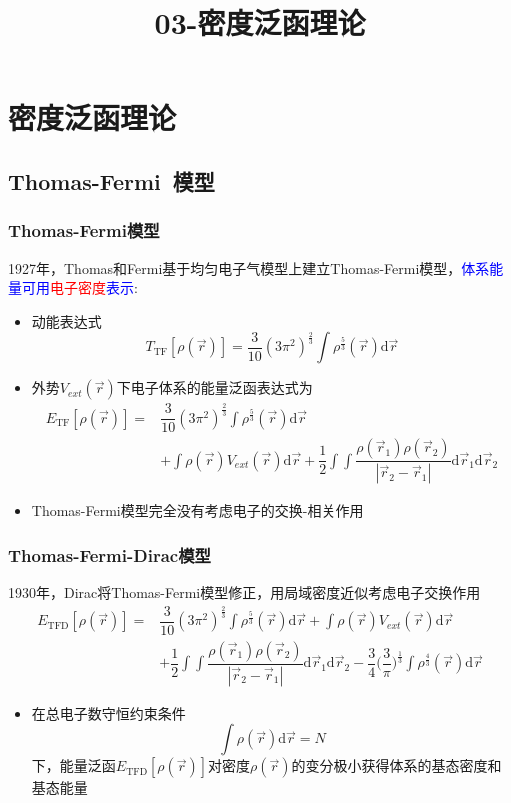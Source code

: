 \title{03-密度泛函理论}
\section{密度泛函理论}       %
\subsection{\rm{Thomas-Fermi~}模型}       %
\frame
{
	\frametitle{\textrm{Thomas-Fermi}模型} 
	\textrm{1927}年，\textrm{Thomas}和\textrm{Fermi}基于均匀电子气模型上建立\textrm{Thomas-Fermi}模型，\textcolor{blue}{体系能量可用}\textcolor{red}{电子密度}\textcolor{blue}{表示}:
	\begin{itemize}
		\item 动能表达式
			$$T_{\mathrm{TF}}[\rho(\vec r)]=\dfrac3{10}(3\pi^2)^{\frac23}\int\rho^{\frac53}(\vec r)\mathrm{d}\vec r$$
		\item 外势$V_{ext}(\vec r)$下电子体系的能量泛函表达式为
			\begin{displaymath}
				\begin{aligned}
					E_{\mathrm{TF}}[\rho(\vec r)]=&\dfrac3{10}(3\pi^2)^{\frac23}\int\rho^{\frac53}(\vec r)\mathrm{d}\vec r\\
					&+\int\rho(\vec r)V_{ext}(\vec r)\mathrm{d}\vec r+\dfrac12\int\int\dfrac{\rho(\vec r_1)\rho(\vec r_2)}{|\vec r_2-\vec r_1|}\mathrm{d}\vec r_1\mathrm{d}\vec r_2
				\end{aligned}
			\end{displaymath}
		\item \textrm{Thomas-Fermi}模型完全没有考虑电子的交换-相关作用
	\end{itemize}
}

\frame
{
	\frametitle{\textrm{Thomas-Fermi-Dirac}模型} 
	1930年，\textrm{Dirac}将\textrm{Thomas-Fermi}模型修正，用局域密度近似考虑电子交换作用
			\begin{displaymath}
				\begin{aligned}
					E_{\mathrm{TFD}}[\rho(\vec r)]=&\dfrac3{10}(3\pi^2)^{\frac23}\int\rho^{\frac53}(\vec r)\mathrm{d}\vec r+\int\rho(\vec r)V_{ext}(\vec r)\mathrm{d}\vec r\\
					&+\dfrac12\int\int\dfrac{\rho(\vec r_1)\rho(\vec r_2)}{|\vec r_2-\vec r_1|}\mathrm{d}\vec r_1\mathrm{d}\vec r_2-\dfrac34\bigg(\dfrac3{\pi}\bigg)^{\frac13}\int\rho^{\frac43}(\vec r)\mathrm{d}\vec r
				\end{aligned}
			\end{displaymath}
			\begin{itemize}
				\item 在总电子数守恒约束条件
					$$\int\rho(\vec r)\mathrm{d}\vec r=N$$
					下，能量泛函$E_{\mathrm{TFD}}[\rho(\vec r)]$对密度$\rho(\vec r)$的变分极小获得体系的基态密度和基态能量
			\end{itemize}
}

